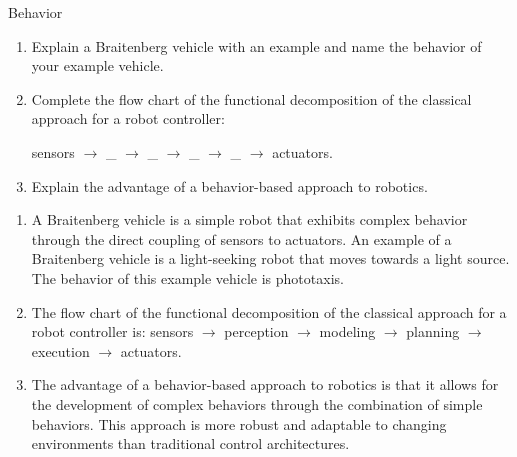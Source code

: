 \documentclass{article}
\begin{document}
\begin{exercise}{Behavior}
  \begin{enumerate}
    \item Explain a Braitenberg vehicle with an example and name the behavior of your example vehicle.
    \item Complete the flow chart of the functional decomposition of the classical approach for a robot controller:
          \begin{center}sensors $\rightarrow$ \_ $\rightarrow$ \_ $\rightarrow$ \_ $\rightarrow$ \_ $\rightarrow$ actuators.\end{center}
    \item Explain the advantage of a behavior-based approach to robotics.
  \end{enumerate}

  \begin{solution}
    \begin{enumerate}
      \item A Braitenberg vehicle is a simple robot that exhibits complex behavior through the direct coupling of sensors to actuators. An example of a Braitenberg vehicle is a light-seeking robot that moves towards a light source. The behavior of this example vehicle is phototaxis.
      \item The flow chart of the functional decomposition of the classical approach for a robot controller is: sensors $\rightarrow$ perception $\rightarrow$ modeling $\rightarrow$ planning $\rightarrow$ execution $\rightarrow$ actuators.
      \item The advantage of a behavior-based approach to robotics is that it allows for the development of complex behaviors through the combination of simple behaviors. This approach is more robust and adaptable to changing environments than traditional control architectures.
    \end{enumerate}
  \end{solution}
\end{exercise}
\end{document}

